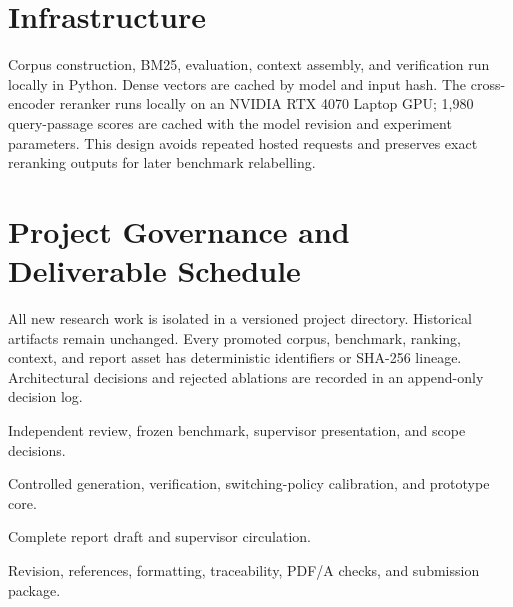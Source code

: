 \section{Infrastructure}

Corpus construction, BM25, evaluation, context assembly, and verification run locally in Python. Dense vectors are cached by model and input hash. The cross-encoder reranker runs locally on an NVIDIA RTX 4070 Laptop \ac{GPU}; 1,980 query-passage scores are cached with the model revision and experiment parameters. This design avoids repeated hosted requests and preserves exact reranking outputs for later benchmark relabelling.

\section{Project Governance and Deliverable Schedule}

All new research work is isolated in a versioned project directory. Historical artifacts remain unchanged. Every promoted corpus, benchmark, ranking, context, and report asset has deterministic identifiers or SHA-256 lineage. Architectural decisions and rejected ablations are recorded in an append-only decision log.

\begin{description}[style=multiline,leftmargin=3.7cm,labelwidth=3.1cm]
  \item[23--29 July] Independent review, frozen benchmark, supervisor presentation, and scope decisions.
  \item[30 July--9 August] Controlled generation, verification, switching-policy calibration, and prototype core.
  \item[10--21 August] Complete report draft and supervisor circulation.
  \item[22--28 August] Revision, references, formatting, traceability, PDF/A checks, and submission package.
\end{description}


